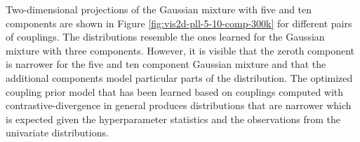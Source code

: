 \documentclass[11pt,a4paper,twoside]{book}
\theoremstyle{definition}
\theoremstyle{definition}
\theoremstyle{remark}
\begin{document}
Two-dimensional projections of the Gaussian mixture with five and ten
components are shown in Figure \ref{fig:vis2d-pll-5-10-comp-300k} for
different pairs of couplings. The distributions resemble the ones
learned for the Gaussian mixture with three components. However, it is
visible that the zeroth component is narrower for the five and ten
component Gaussian mixture and that the additional components model
particular parts of the distribution. The optimized coupling prior model
that has been learned based on couplings computed with
contrastive-divergence in general produces distributions that are
narrower which is expected given the hyperparameter statistics and the
observations from the univariate distributions.
\end{document}
